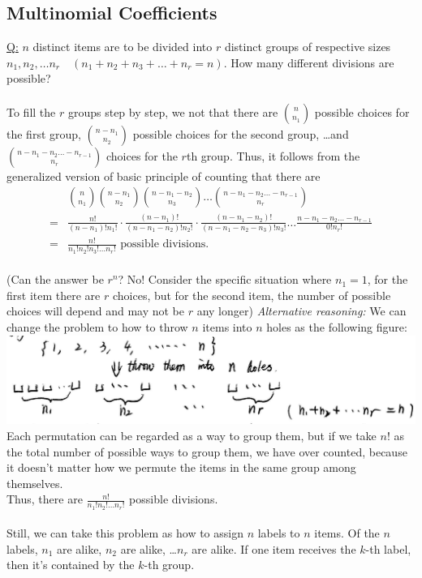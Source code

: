 \documentclass[11pt, letterpaper]{article}
\begin{document}
\subsection{Multinomial Coefficients}
\underline{Q:} $n$ distinct items are to be divided into $r$ distinct groups of respective sizes $n_1, n_2, \dots n_r\quad(n_1 + n_2 + n_3 + \dots + n_r = n)$. How many different divisions are possible? \\ \\
\noindent
To fill the $r$ groups step by step, we not that there are $\binom{n}{n_1}$ possible choices for the first group, $\binom{n-n_1}{n_2}$ possible choices for the second group, \dots and $\binom{n-n_1-n_2\dots-n_{r-1}}{n_r}$ choices for the $r$th group. Thus, it follows from the generalized version of basic principle of counting that there are
\begin{align*}
  &\binom{n}{n_1}\binom{n-n_1}{n_2}\binom{n-n_1-n_2}{n_3}\dots\binom{n-n_1-n_2\dots-n_{r-1}}{n_r} \\
  = &\frac{n!}{(n-n_1)!n_1!}\cdot\frac{(n-n_1)!}{(n-n_1-n_2)!n_2!}\cdot\frac{(n-n_1-n_2)!}{(n-n_1-n_2-n_3)!n_3!}\dots\frac{n-n_1-n_2\dots-n_{r-1}}{0!n_r!} \\
  = &\frac{n!}{n_1!n_2!n_3!\dots n_r!} \text{ possible divisions}.
\end{align*} \\
(Can the answer be $r^n$? No! Consider the specific situation where $n_1 = 1$, for the first item there are $r$ choices, but for the second item, the number of possible choices will depend and may not be $r$ any longer) \clearpage
\textit{Alternative reasoning:} We can change the problem to how to throw $n$ items into $n$ holes as the following figure: \\
\includegraphics[scale=0.25]{1-4} \\
Each permutation can be regarded as a way to group them, but if we take $n!$ as the total number of possible ways to group them, we have over counted, because it doesn't matter how we permute the items in the same group among themselves. \\
Thus, there are $\frac{n!}{n_1!n_2!\dots n_r!}$ possible divisions. \\ \\
\noindent
Still, we can take this problem as how to assign $n$ labels to $n$ items. Of the $n$ labels, $n_1$ are alike, $n_2$ are alike, \dots $n_r$ are alike. If one item receives the $k$-th  label, then it's contained by the $k$-th group. \\
\vspace{0.2cm}
\end{document}
